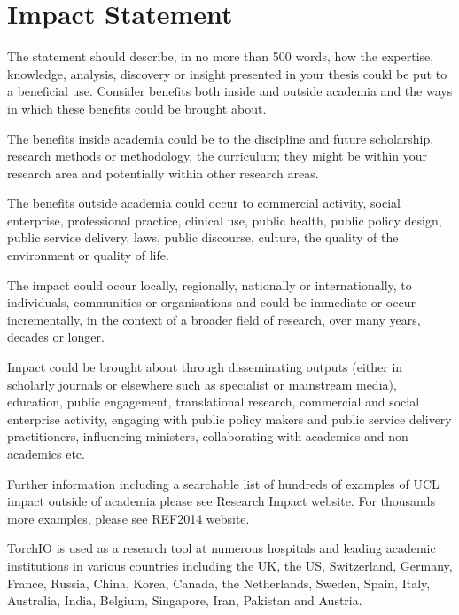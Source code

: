 \chapter{Impact Statement}

The statement should describe, in no more than 500 words, how the expertise, knowledge, analysis,
discovery or insight presented in your thesis could be put to a beneficial use. Consider benefits both
inside and outside academia and the ways in which these benefits could be brought about.

The benefits inside academia could be to the discipline and future scholarship, research methods
or methodology, the curriculum; they might be within your research area and potentially within other
research areas.

The benefits outside academia could occur to commercial activity, social enterprise, professional
practice, clinical use, public health, public policy design, public service delivery, laws, public
discourse, culture, the quality of the environment or quality of life.

The impact could occur locally, regionally, nationally or internationally, to individuals, communities
or organisations and could be immediate or occur incrementally, in the context of a broader field of
research, over many years, decades or longer.

Impact could be brought about through disseminating outputs (either in scholarly journals or
elsewhere such as specialist or mainstream media), education, public engagement, translational
research, commercial and social enterprise activity, engaging with public policy makers and public
service delivery practitioners, influencing ministers, collaborating with academics and non-academics
etc.

Further information including a searchable list of hundreds of examples of UCL impact outside
of academia please see Research Impact website. For thousands more examples, please see
REF2014 website.


TorchIO is used as a research tool at numerous hospitals and leading academic institutions in various countries including the UK, the US, Switzerland, Germany, France, Russia, China, Korea, Canada, the Netherlands, Sweden, Spain, Italy, Australia, India, Belgium, Singapore, Iran, Pakistan and Austria.

